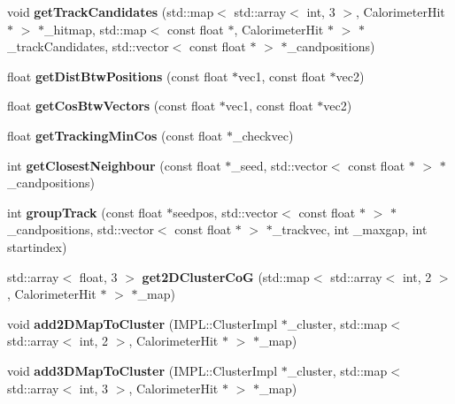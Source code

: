 \begin{DoxyCompactItemize}
\item 
void {\bfseries get\-Track\-Candidates} (std\-::map$<$ std\-::array$<$ int, 3 $>$, Calorimeter\-Hit $\ast$ $>$ $\ast$\-\_\-hitmap, std\-::map$<$ const float $\ast$, Calorimeter\-Hit $\ast$ $>$ $\ast$\-\_\-track\-Candidates, std\-::vector$<$ const float $\ast$ $>$ $\ast$\-\_\-candpositions)\label{classCALICE_1_1ClusterCounter_a0fbc91fa8970a74c23fc3d703fb215f7}

\item 
float {\bfseries get\-Dist\-Btw\-Positions} (const float $\ast$vec1, const float $\ast$vec2)\label{classCALICE_1_1ClusterCounter_a9bcc1daafc86819a4bacb2b0627fbb47}

\item 
float {\bfseries get\-Cos\-Btw\-Vectors} (const float $\ast$vec1, const float $\ast$vec2)\label{classCALICE_1_1ClusterCounter_a50fc201fdc59707bbf6bcfdc785c3a62}

\item 
float {\bfseries get\-Tracking\-Min\-Cos} (const float $\ast$\-\_\-checkvec)\label{classCALICE_1_1ClusterCounter_a166e683a158fe2ba8896a5365d8fb8ed}

\item 
int {\bfseries get\-Closest\-Neighbour} (const float $\ast$\-\_\-seed, std\-::vector$<$ const float $\ast$ $>$ $\ast$\-\_\-candpositions)\label{classCALICE_1_1ClusterCounter_aa026f09e7f6cb1e01920104e517dd7a7}

\item 
int {\bfseries group\-Track} (const float $\ast$seedpos, std\-::vector$<$ const float $\ast$ $>$ $\ast$\-\_\-candpositions, std\-::vector$<$ const float $\ast$ $>$ $\ast$\-\_\-trackvec, int \-\_\-maxgap, int startindex)\label{classCALICE_1_1ClusterCounter_a1934fceecaaaadf6afa948159e146a66}

\item 
std\-::array$<$ float, 3 $>$ {\bfseries get2\-D\-Cluster\-Co\-G} (std\-::map$<$ std\-::array$<$ int, 2 $>$, Calorimeter\-Hit $\ast$ $>$ $\ast$\-\_\-map)\label{classCALICE_1_1ClusterCounter_a5aeb7163d4ef3b7d6446fd333cfb0c0a}

\item 
void {\bfseries add2\-D\-Map\-To\-Cluster} (I\-M\-P\-L\-::\-Cluster\-Impl $\ast$\-\_\-cluster, std\-::map$<$ std\-::array$<$ int, 2 $>$, Calorimeter\-Hit $\ast$ $>$ $\ast$\-\_\-map)\label{classCALICE_1_1ClusterCounter_a73014ac09605de1878969ce20c04b725}

\item 
void {\bfseries add3\-D\-Map\-To\-Cluster} (I\-M\-P\-L\-::\-Cluster\-Impl $\ast$\-\_\-cluster, std\-::map$<$ std\-::array$<$ int, 3 $>$, Calorimeter\-Hit $\ast$ $>$ $\ast$\-\_\-map)\label{classCALICE_1_1ClusterCounter_a3a1f9e8010caabbd2aa65a60b91eb9e0}

\end{DoxyCompactItemize}

